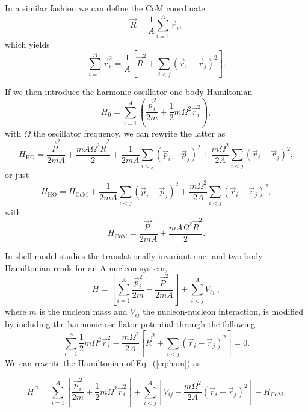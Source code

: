 \documentclass[twoside,12pt]{article}
\begin{document}
In a similar fashion we can define the CoM coordinate
\begin{equation}
    \vec{R}=\frac{1}{A}\sum_{i=1}^{A}\vec{r}_i,
\end{equation}
which yields
\begin{equation}
\sum_{i=1}^A\vec{r}_i^2 =
\frac{1}{A}\left[\vec{R}^2+\sum_{i<j}(\vec{r}_i-\vec{r}_j)^2\right].
\end{equation}

If we then introduce the harmonic oscillator one-body Hamiltonian
\begin{equation}
     H_0= \sum_{i=1}^A\left(\frac{\vec{p}_i^2}{2m}+
          \frac{1}{2}m\Omega^2\vec{r}_i^2\right),
\end{equation}
with $\Omega$ the oscillator frequency,
we can rewrite the latter as 
\begin{equation}
     H_{\mathrm{HO}}= \frac{\vec{P}^2}{2mA}+\frac{mA\Omega^2\vec{R}^2}{2}
           +\frac{1}{2mA}\sum_{i<j}(\vec{p}_i-\vec{p}_j)^2
           +\frac{m\Omega^2}{2A}\sum_{i<j}(\vec{r}_i-\vec{r}_j)^2,
    \label{eq:obho}
\end{equation}
or just
\begin{equation}
H_{\mathrm{HO}}= H_{\mathrm{CoM}}+\frac{1}{2mA}\sum_{i<j}(\vec{p}_i-\vec{p}_j)^2
           +\frac{m\Omega^2}{2A}\sum_{i<j}(\vec{r}_i-\vec{r}_j)^2,
\end{equation}
with 
\begin{equation}
     H_{\mathrm{CoM}}= \frac{\vec{P}^2}{2mA}+\frac{mA\Omega^2\vec{R}^2}{2}.
\end{equation}

In shell model studies the translationally invariant one- and two-body 
Hamiltonian reads
for an A-nucleon system,
%
\begin{equation}\label{eq:ham}
H=\left[\sum_{i=1}^A\frac{\vec{p}_i^2}{2m} -\frac{\vec{P}^2}{2mA}\right] +\sum_{i<j}^A V_{ij} \; ,
\end{equation}
%
where $m$ is the nucleon mass and $V_{ij}$ the nucleon-nucleon interaction,
is  modified by including the harmonic oscillator potential through the 
following
\begin{equation}
\sum_{i=1}^A\frac{1}{2}m\Omega^2\vec{r}_i^2-
\frac{m\Omega^2}{2A}\left[\vec{R}^2+\sum_{i<j}(\vec{r}_i-\vec{r}_j)^2\right]=0.
\end{equation}
We can rewrite the Hamiltonian of Eq.~(\ref{eq:ham}) as

\begin{equation}\label{hamomega}
H^\Omega=\sum_{i=1}^A \left[ \frac{\vec{p}_i^2}{2m}
+\frac{1}{2}m\Omega^2 \vec{r}^2_i
\right] + \sum_{i<j}^A \left[ V_{ij}-\frac{m\Omega^2}{2A}
(\vec{r}_i-\vec{r}_j)^2
\right] -H_{\mathrm{CoM}}.
\end{equation}
\end{document}
